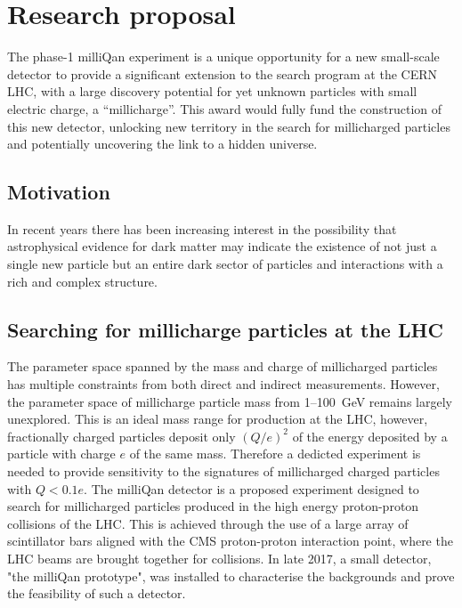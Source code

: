 \documentclass[11pt]{article}
\theoremstyle{plain} \numberwithin{equation}{section}
\theoremstyle{definition}
\begin{document}
\section*{Research proposal}
\noindent 

The phase-1 milliQan experiment is a unique opportunity for a 
new small-scale detector to provide a significant extension to the search 
program at the CERN LHC, with a large discovery potential 
for yet unknown particles with small electric charge, a ``millicharge''. 
This award would fully fund the construction of this new detector,
unlocking new territory in the search for millicharged particles and
potentially uncovering the link to a hidden universe.

\subsection*{Motivation}

In recent years there has been increasing interest in the possibility 
that astrophysical evidence for dark matter may indicate the existence 
of not just a single new particle but an entire dark sector
of particles and interactions with a rich and complex structure. 
%
\subsection*{Searching for millicharge particles at the LHC}
%
The parameter space spanned by the mass and charge of millicharged particles
has multiple constraints from both direct and indirect measurements.
However, the parameter space of millicharge particle mass from 1--100~GeV remains 
largely unexplored. This is an ideal mass
range for production at the LHC, however,
fractionally charged particles deposit only $(Q/e)^2$ of the energy 
deposited by a particle with charge $e$ of
the same mass. Therefore a dedicted experiment is needed to provide sensitivity to the signatures of 
millicharged charged particles with $Q< 0.1 e$. The milliQan detector is a proposed experiment
designed to search for millicharged particles produced in the
high energy proton-proton collisions of the LHC. 
This is achieved through the use of a 
large array of scintillator bars aligned with the CMS proton-proton 
interaction point, where the LHC beams are brought together for collisions. 
In late 2017, a small detector, "the milliQan prototype", was installed to characterise the backgrounds and
prove the feasibility of such a detector.
\end{document}
